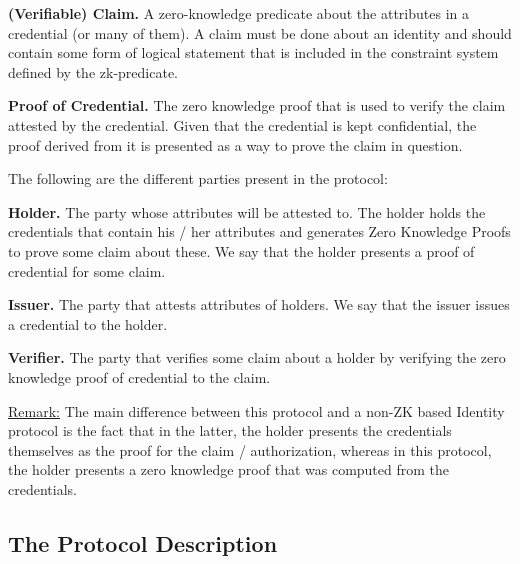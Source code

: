 \textbf{(Verifiable) Claim.} A zero-knowledge predicate about the attributes in a credential (or many of them). A claim must be done about an identity and should contain some form of logical statement that is included in the constraint system defined by the zk-predicate. 

\textbf{Proof of Credential.} The zero knowledge proof that is used to verify the claim attested by the credential. Given that the credential is kept confidential, the proof derived from it is presented as a way to prove the claim in question.

\vspace{1em}
\noindent The following are the different parties present in the protocol:

\textbf{Holder.} The party whose attributes will be attested to. The holder holds the credentials that contain his / her attributes and generates Zero Knowledge Proofs to prove some claim about these. We say that the holder presents a proof of credential for some claim.

\textbf{Issuer.} The party that attests attributes of holders. We say that the issuer issues a credential to the holder.

\textbf{Verifier.} The party that verifies some claim about a holder by verifying the zero knowledge proof of credential to the claim.

\vspace{1em}
\noindent\underline{Remark:} The main difference between this protocol and a non-ZK based Identity protocol is the fact that in the latter, the holder presents the credentials themselves as the proof for the claim / authorization, whereas in this protocol, the holder presents a zero knowledge proof that was computed from the credentials.


\subsection{The Protocol Description}
\label{sec:apps:id-framework:protocol-description}


